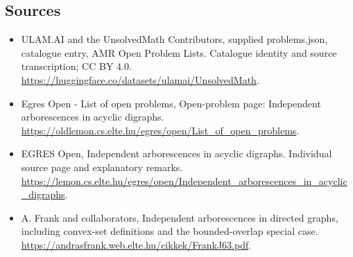\documentclass[11pt,a4paper]{article}
\begin{document}
\subsection{Sources}
\begin{itemize}
\item[S1] ULAM.AI and the UnsolvedMath Contributors, supplied problems.json, catalogue entry, AMR Open Problem Lists. Catalogue identity and source transcription; CC BY 4.0.
\url{https://huggingface.co/datasets/ulamai/UnsolvedMath}.
\item[S2] Egres Open - List of open problems, Open-problem page: Independent arborescences in acyclic digraphs. 
\url{https://oldlemon.cs.elte.hu/egres/open/List_of_open_problems}.
\item[S3] EGRES Open, Independent arborescences in acyclic digraphs. Individual source page and explanatory remarks.
\url{https://lemon.cs.elte.hu/egres/open/Independent_arborescences_in_acyclic_digraphs}.
\item[S4] A. Frank and collaborators, Independent arborescences in directed graphs, including convex-set definitions and the bounded-overlap special case.
\url{https://andrasfrank.web.elte.hu/cikkek/FrankJ63.pdf}.
\end{itemize}
\end{document}
